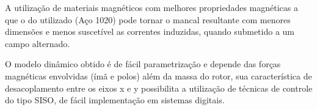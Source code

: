 A utilização de materiais magnéticos com melhores propriedades magnéticas a que o do utilizado (Aço 1020) pode tornar o mancal resultante com menores dimensões e menos suscetível as correntes induzidas, quando submetido a um campo alternado. 

O modelo dinâmico obtido é de fácil parametrização e depende das forças magnéticas envolvidas (ímã e polos) além da massa do rotor, sua característica de desacoplamento entre os eixos x e y possibilita a utilização de técnicas de controle do tipo SISO, de fácil implementação em sistemas digitais.













